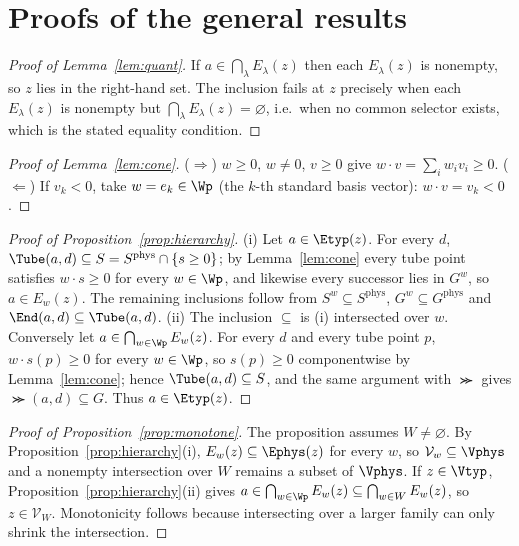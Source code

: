 \appendix

\section{Proofs of the general results}\label{app:general}

\begin{proof}[Proof of Lemma~\ref{lem:quant}]
If $a\in\bigcap_\lambda E_\lambda(z)$ then each $E_\lambda(z)$ is nonempty, so $z$ lies in the right-hand set. The inclusion fails at $z$ precisely when each $E_\lambda(z)$ is nonempty but $\bigcap_\lambda E_\lambda(z)=\varnothing$, i.e.\ when no common selector exists, which is the stated equality condition.
\end{proof}

\begin{proof}[Proof of Lemma~\ref{lem:cone}]
($\Rightarrow$) $w\ge0$, $w\ne0$, $v\ge0$ give $w\cdot v=\sum_iw_iv_i\ge0$. ($\Leftarrow$) If $v_k<0$, take $w=e_k\in\Wp$ (the $k$-th standard basis vector): $w\cdot v=v_k<0$.
\end{proof}

\begin{proof}[Proof of Proposition~\ref{prop:hierarchy}]
(i) Let $a\in\Etyp(z)$. For every $d$, $\Tube(a,d)\subseteq S=S^{\mathrm{phys}}\cap\{s\ge0\}$; by Lemma~\ref{lem:cone} every tube point satisfies $w\cdot s\ge0$ for every $w\in\Wp$, and likewise every successor lies in $G^w$, so $a\in E_w(z)$. The remaining inclusions follow from $S^w\subseteq S^{\mathrm{phys}}$, $G^w\subseteq G^{\mathrm{phys}}$ and $\End(a,d)\subseteq\Tube(a,d)$.
(ii) The inclusion $\subseteq$ is (i) intersected over $w$. Conversely let $a\in\bigcap_{w\in\Wp}E_w(z)$. For every $d$ and every tube point $p$, $w\cdot s(p)\ge0$ for every $w\in\Wp$, so $s(p)\ge0$ componentwise by Lemma~\ref{lem:cone}; hence $\Tube(a,d)\subseteq S$, and the same argument with $\Succ$ gives $\Succ(a,d)\subseteq G$. Thus $a\in\Etyp(z)$.
\end{proof}

\begin{proof}[Proof of Proposition~\ref{prop:monotone}]
The proposition assumes $W\ne\varnothing$. By Proposition~\ref{prop:hierarchy}(i), $E_w(z)\subseteq\Ephys(z)$ for every $w$, so $\mathcal V_w\subseteq\Vphys$ and a nonempty intersection over $W$ remains a subset of $\Vphys$. If $z\in\Vtyp$, Proposition~\ref{prop:hierarchy}(ii) gives $a\in\bigcap_{w\in\Wp}E_w(z)\subseteq\bigcap_{w\in W}E_w(z)$, so $z\in\mathcal V_W$. Monotonicity follows because intersecting over a larger family can only shrink the intersection.
\end{proof}

